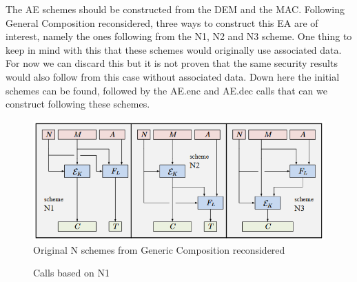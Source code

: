 \documentclass{article}
\begin{document}
\noindent The AE schemes should be constructed from the DEM and the MAC. Following General Composition reconsidered, three ways to construct this EA are of interest, namely the ones following from the N1, N2 and N3 scheme. One thing to keep in mind with this that these schemes would originally use associated data. For now we can discard this but it is not proven that the same security results would also follow from this case without associated data. Down here the initial schemes can be found, followed by the AE.enc and AE.dec calls that can we construct following these schemes.
\begin{figure}[H]
    \centering
    \includegraphics[scale = 0.7]{images/N games.png}
\caption{Original N schemes from Generic Composition reconsidered}
\end{figure}

\begin{figure}[H]
    \begin{pchstack}[boxed,center,space=0.5cm]
    \end{pchstack}
\caption{Calls based on N1}
\end{figure}
\end{document}
